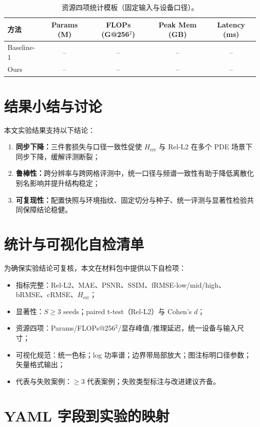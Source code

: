 \begin{table}[t]
\centering
\caption{资源四项统计模板（固定输入与设备口径）。}
\label{tab:resources}
\begin{tabular}{lcccc}
\toprule
方法 & Params (M) & FLOPs (G@256$^2$) & Peak Mem (GB) & Latency (ms)\\
\midrule
Baseline-1 & -- & -- & -- & --\\
Ours & -- & -- & -- & --\\
\bottomrule
\end{tabular}
\end{table}

\section{结果小结与讨论}\label{sec:discussion}

本文实验结果支持以下结论：
\begin{enumerate}
  \item \textbf{同步下降：}三件套损失与口径一致性促使 $H_{\mathrm{err}}$ 与 Rel-L2 在多个 PDE 场景下同步下降，缓解评测断裂；
  \item \textbf{鲁棒性：}跨分辨率与跨网格评测中，统一口径与频谱一致性有助于降低离散化别名影响并提升结构稳定；
  \item \textbf{可复现性：}配置快照与环境指纹、固定切分与种子、统一评测与显著性检验共同保障结论稳健。
\end{enumerate}

\section{统计与可视化自检清单}\label{sec:selfcheck}

为确保实验结论可复核，本文在材料包中提供以下自检项：
\begin{itemize}
  \item 指标完整：Rel-L2、MAE、PSNR、SSIM、fRMSE-low/mid/high、bRMSE、cRMSE、$H_{\mathrm{err}}$；
  \item 显著性：$S\ge 3$ seeds；paired t-test（Rel-L2）与 Cohen's $d$；
  \item 资源四项：Params/FLOPs@256$^2$/显存峰值/推理延迟，统一设备与输入尺寸；
  \item 可视化规范：统一色标；log 功率谱；边界带局部放大；图注标明口径参数；矢量格式输出；
  \item 代表与失败案例：$\ge 3$ 代表案例；失败类型标注与改进建议齐备。
\end{itemize}

\section{YAML 字段到实验的映射}\label{sec:yaml_map}

